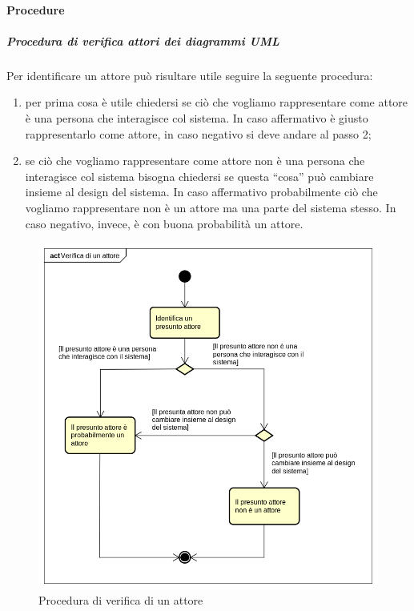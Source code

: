 \documentclass[../NormeProgetto.tex]{subfiles}
\begin{document}
		\paragraph{Procedure}
		\subparagraph{Procedura di verifica attori dei diagrammi UML}\label{par:Procedura di verifica degli attori dei diagrammi UML}
			Per identificare un attore può risultare utile seguire la seguente procedura:
			\begin{enumerate}
				\item per prima cosa è utile chiedersi se ciò che vogliamo rappresentare come attore è una persona che interagisce col sistema. In caso affermativo è giusto rappresentarlo come attore, in caso negativo si deve andare al passo 2;
				\item se ciò che vogliamo rappresentare come attore non è una persona che interagisce col sistema bisogna chiedersi se questa ``cosa'' può cambiare insieme al design del sistema. In caso affermativo probabilmente ciò che vogliamo rappresentare non è un attore ma una parte del sistema stesso. In caso negativo, invece, è con buona probabilità un attore.
			\end{enumerate}
			\begin{figure}[H]
				\centering
				\includegraphics[scale=0.5, width=\textwidth]{sections/img/proceduraVerificaAttori.png}
				\caption{Procedura di verifica di un attore}\label{fig:Procedura di verifica di un attore} 
			\end{figure}
\end{document}
